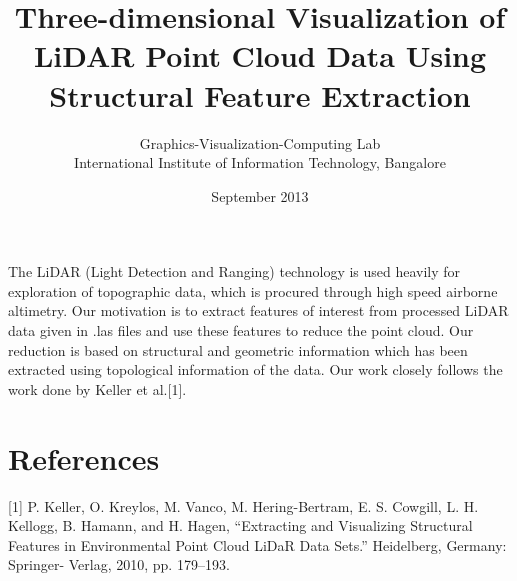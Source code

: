 \documentclass{article}
\title{Three-dimensional Visualization of LiDAR Point Cloud Data Using
  Structural Feature Extraction}
\author{Graphics-Visualization-Computing Lab \\
International Institute of Information Technology, Bangalore}
\date{September 2013}
\begin{document}
\maketitle
The LiDAR (Light Detection and Ranging) technology is used
heavily for exploration of topographic data, which is procured through high
speed airborne altimetry. Our motivation is to extract features of interest
from processed LiDAR data given in .las files and use these features to
reduce the point cloud. Our reduction is based on structural and geometric
information which has been extracted using topological information of the
data. Our work closely follows the work done by Keller et al.[1].

\section*{References}
[1] P. Keller, O. Kreylos, M. Vanco, M. Hering-Bertram, E. S.
Cowgill, L. H. Kellogg, B. Hamann, and H. Hagen, ``Extracting
and Visualizing Structural Features in Environmental Point
Cloud LiDaR Data Sets.'' Heidelberg, Germany: Springer-
Verlag, 2010, pp. 179--193.
\end{document}

